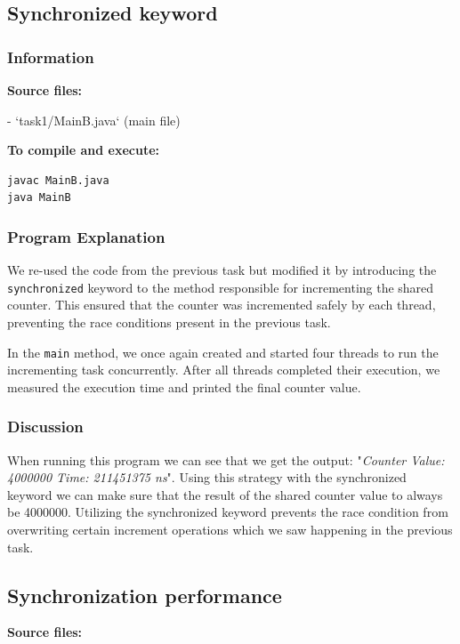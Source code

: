 \documentclass{article}
\begin{document}
\subsection{Synchronized keyword}
\subsubsection{Information}
\textbf{Source files:}

- `task1/MainB.java` (main file)

\textbf{To compile and execute:}
\begin{lstlisting}[style=bash]
javac MainB.java
java MainB
\end{lstlisting}


\subsubsection{Program Explanation}
We re-used the code from the previous task but modified it by introducing the \texttt{synchronized} keyword to the method responsible for incrementing the shared counter. This ensured that the counter was incremented safely by each thread, preventing the race conditions present in the previous task.

In the \texttt{main} method, we once again created and started four threads to run the incrementing task concurrently. After all threads completed their execution, we measured the execution time and printed the final counter value.

\subsubsection{Discussion}
When running this program we can see that we get the output: "\textit{Counter Value: 4000000
Time: 211451375 ns}". Using this strategy with the synchronized keyword we can make sure that the result of the shared counter value to always be 4000000. Utilizing the synchronized keyword prevents the race condition from overwriting certain increment operations which we saw happening in the previous task.





%
%
%
%
%
%
%
\subsection{Synchronization performance}
\textbf{Source files:}
\end{document}
